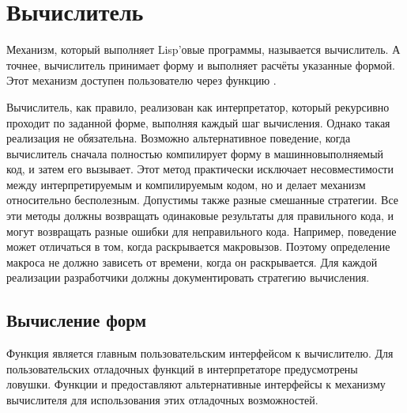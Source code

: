 \else

\chapter{Вычислитель}

Механизм, который выполняет Lisp'овые программы, называется вычислитель.
А точнее, вычислитель принимает форму и выполняет расчёты указанные формой.
Этот механизм доступен пользователю через функцию .

Вычислитель, как правило, реализован как интерпретатор, который рекурсивно
проходит по заданной форме, выполняя каждый шаг вычисления. Однако такая
реализация не обязательна. Возможно альтернативное поведение, когда вычислитель
сначала полностью компилирует форму в машинновыполняемый код, и затем его
вызывает.
Этот метод практически исключает несовместимости между интерпретируемым и
компилируемым кодом, но и делает механизм  относительно
бесполезным.
Допустимы также разные смешанные стратегии. Все эти методы должны возвращать
одинаковые результаты для правильного кода, и могут возвращать разные ошибки для
неправильного кода.
Например, поведение может отличаться в том, когда раскрывается
макровызов. Поэтому определение макроса не должно зависеть от времени, когда он
раскрывается. Для каждой реализации разработчики должны документировать
стратегию вычисления. 

\section{Вычисление форм}

Функция  является главным пользовательским интерфейсом к вычислителю.
Для пользовательских отладочных функций в интерпретаторе предусмотрены ловушки. 
Функции  и  предоставляют альтернативные интерфейсы
к механизму вычислителя для использования этих отладочных возможностей.

